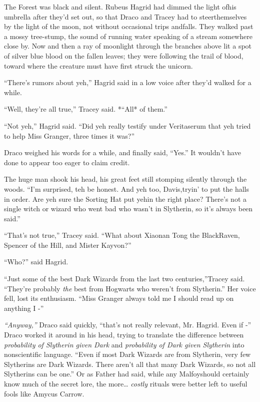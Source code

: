 The Forest was black and silent. Rubeus Hagrid had dimmed the light ofhis umbrella after they'd set out, so that Draco and Tracey had to steerthemselves by the light of the moon, not without occasional trips andfalls. They walked past a mossy tree-stump, the sound of running water speaking of a stream somewhere close by. Now and then a ray of moonlight through the branches above lit a spot of silver blue blood on the fallen leaves; they were following the trail of blood, toward where the creature must have first struck the unicorn.

``There's rumors about yeh,'' Hagrid said in a low voice after they'd walked for a while.

``Well, they're all true,'' Tracey said. *``All* of them.''

``Not yeh,'' Hagrid said. ``Did yeh really testify under Veritaserum that yeh tried to help Miss Granger, three times it was?''

Draco weighed his words for a while, and finally said, ``Yes.'' It wouldn't have done to appear too eager to claim credit.

The huge man shook his head, his great feet still stomping silently through the woods. ``I'm surprised, teh be honest. And yeh too, Davis,tryin' to put the halls in order. Are yeh sure the Sorting Hat put yehin the right place? There's not a single witch or wizard who went bad who wasn't in Slytherin, so it's always been said.''

``That's not true,'' Tracey said. ``What about Xiaonan Tong the BlackRaven, Spencer of the Hill, and Mister Kayvon?''

``Who?'' said Hagrid.

``Just some of the best Dark Wizards from the last two centuries,''Tracey said. ``They're probably \emph{the} best from Hogwarts who weren't from Slytherin.'' Her voice fell, lost its enthusiasm. ``Miss Granger always told me I should read up on anything I -''

\emph{``Anyway,''} Draco said quickly, ``that's not really relevant, Mr. Hagrid. Even if -'' Draco worked it around in his head, trying to translate the difference between \emph{probability of Slytherin given Dark} and \emph{probability of Dark given Slytherin} into nonscientific language. ``Even if most Dark Wizards are from Slytherin, very few Slytherins are Dark Wizards. There aren't all that many Dark Wizards, so not all Slytherins can be one.'' Or as Father had said, while any Malfoyshould certainly know much of the secret lore, the more\ldots{}
\emph{costly} rituals were better left to useful fools like Amycus Carrow.

